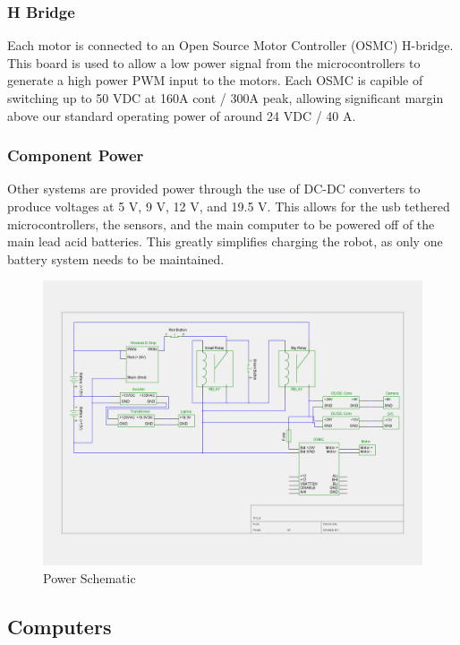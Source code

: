 \subsubsection{H Bridge}

Each motor is connected to an Open Source Motor Controller (OSMC) H-bridge. This board is used to allow a low power signal from the microcontrollers to generate a high power PWM input to the motors. Each OSMC is capible of switching up to 50 VDC at 160A cont / 300A peak, allowing significant margin above our standard operating power of around 24 VDC / 40 A.

\subsubsection{Component Power}

Other systems are provided power through the use of DC-DC converters to produce voltages at 5 V, 9 V, 12 V, and 19.5 V. This allows for the usb tethered microcontrollers, the sensors, and the main computer to be powered off of the main lead acid batteries. This greatly simplifies charging the robot, as only one battery system needs to be maintained.

\begin{figure}[H]
\begin{center}
\includegraphics[width=6in]{./igvc_power.png}
\caption{Power Schematic}
\label{FIG:Power}
\end{center}
\end{figure}

\subsection{Computers}

